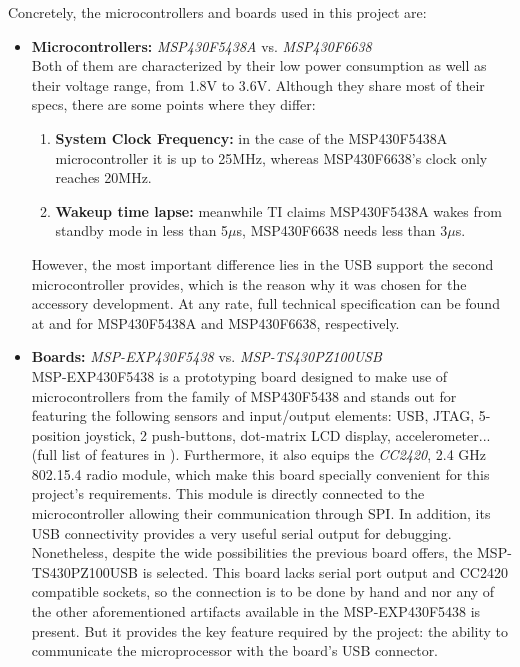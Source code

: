 			Concretely, the microcontrollers and boards used in this project are:
			\begin{itemize}
				\item \textbf{Microcontrollers:} \emph{MSP430F5438A} vs. \emph{MSP430F6638}\\
					Both of them are characterized by their low power consumption as well as their voltage 
					range, from 1.8V to 3.6V. Although they share most of their specs, there are some points
					where they differ:
					\begin{enumerate}
						\item \textbf{System Clock Frequency:} in the case of the MSP430F5438A microcontroller
							it is up to 25MHz, whereas MSP430F6638's clock only reaches 20MHz.
						\item \textbf{Wakeup time lapse:} meanwhile TI claims MSP430F5438A wakes from 
							standby mode in less than 5$\mu$s, MSP430F6638 needs less than 3$\mu$s.
					\end{enumerate}
					However, the most important difference lies in the USB support the second microcontroller
					provides, which is the reason why it was chosen for the accessory development. At any rate, 
					full technical specification can be found at \cite{5438a} and \cite{msp430f6638ds} for 
					MSP430F5438A and MSP430F6638, respectively.
				\item \textbf{Boards:} \emph{MSP-EXP430F5438} vs. \emph{MSP-TS430PZ100USB}\\
					MSP-EXP430F5438 \cite{5438aboard} is a prototyping board designed to make use of 
					microcontrollers from the family of MSP430F5438 and stands out for featuring the following 
					sensors and input/output elements: USB, JTAG, 5-position joystick, 2 push-buttons, 
					dot-matrix LCD display, accelerometer... (full list of features in \cite{5438aboard}). 
					Furthermore, it also equips the \emph{CC2420}, 2.4 GHz 802.15.4 radio module, 
					which make	
					this board specially convenient for this project's requirements. This module is directly 
					connected to the microcontroller allowing their communication through SPI. In addition, its
					USB connectivity provides a very useful serial output for debugging.\\
					
					Nonetheless, despite the wide possibilities the previous board offers, the MSP-TS430PZ100USB is selected. This board lacks serial port output and CC2420 compatible sockets, so the connection is to be done by hand and nor any of the other aforementioned artifacts available in the MSP-EXP430F5438 is present. But it provides the key feature required by the project: the ability to communicate the microprocessor with the board's USB connector.
			\end{itemize}
			
